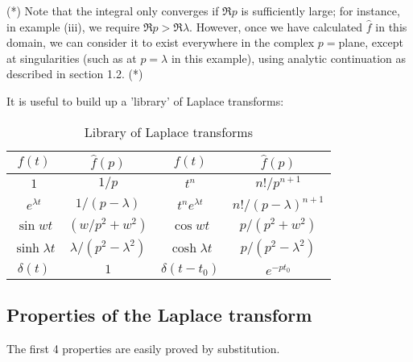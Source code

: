 \documentclass[a4paper]{article}
\begin{document}
(*) Note that the integral only converges if $\Re p$ is sufficiently large; for instance, in example (iii), we require $\Re p > \Re \lambda$. However, once we have calculated $\hat{f}$ in this domain, we can consider it to exist everywhere in the complex $p=$plane, except at singularities (such as at $p=\lambda$ in this example), using analytic continuation as described in section 1.2. (*)

It is useful to build up a 'library' of Laplace transforms:

\begin{table}[ht]
\caption{Library of Laplace transforms} 
\centering
\begin{tabular}{c c c c}
\hline\hline
$f(t)$ & $\hat{f}(p)$ & $f(t)$ & $\hat{f}(p)$ \\ [0.5ex] 
\hline
$1$ & $1/p$ & $t^n$ & $n!/p^{n+1}$\\
$e^{\lambda t}$ & $1/(p-\lambda)$ & $t^n e^{\lambda t}$ & $n!/(p-\lambda)^{n+1}$\\
$\sin wt$ & $(w/p^2+w^2)$ & $\cos wt$ & $p/(p^2+w^2)$\\
$\sinh \lambda t$ & $\lambda/(p^2-\lambda^2)$ & $\cosh \lambda t$ & $p/(p^2-\lambda^2)$\\
$\delta(t)$ & $1$ & $\delta(t-t_0)$ & $e^{-pt_0}$\\
[0.5ex] 
\hline
\end{tabular} 
\end{table}

\subsection{Properties of the Laplace transform}
The first 4 properties are easily proved by substitution.
\end{document}
